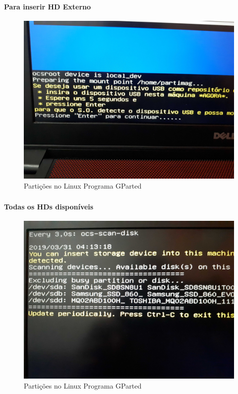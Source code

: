 \documentclass{beamer}
\begin{document}
\begin{frame}[plain,c]
   \frametitle{\insertsection}
    \framesubtitle{Para inserir HD Externo}
    \begin{figure}[!h]
        
        \includegraphics[width=1\linewidth]{images/backup/bkp8.jpg}
        \caption{Partições no Linux Programa GParted}
    \end{figure}
\end{frame}

\begin{frame}[plain,c]
   \frametitle{\insertsection}
    \framesubtitle{Todas os HDs disponíveis}
    \begin{figure}[!h]
        
        \includegraphics[width=1\linewidth]{images/backup/bkp9.jpg}
        \caption{Partições no Linux Programa GParted}
    \end{figure}
\end{frame}
\end{document}
